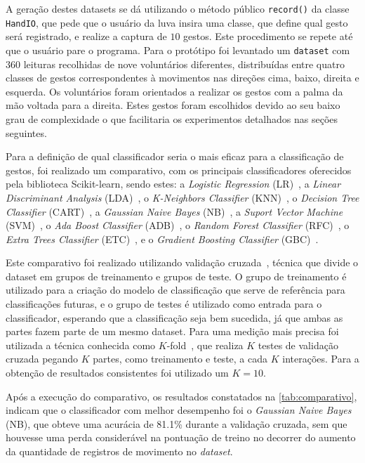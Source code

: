 A geração destes datasets se dá utilizando o método público \texttt{record()} da classe \texttt{HandIO}, que pede que o usuário da luva insira uma classe, que define qual gesto será registrado, e realize a captura de $10$ gestos. Este procedimento se repete até que o usuário pare o programa. Para o protótipo foi levantado um \texttt{dataset} com $360$ leituras recolhidas de nove voluntários diferentes, distribuídas entre quatro classes de gestos correspondentes à movimentos nas direções cima, baixo, direita e esquerda. Os voluntários foram orientados a realizar os gestos com a palma da mão voltada para a direita. Estes gestos foram escolhidos devido ao seu baixo grau de complexidade o que facilitaria os experimentos detalhados nas seções seguintes.

Para a definição de qual classificador seria o mais eficaz para a classificação de gestos, foi realizado um comparativo, com os principais classificadores oferecidos pela biblioteca Scikit-learn, sendo estes: a \textit{Logistic Regression} (LR)~\cite{scikit:lr}, a \textit{Linear Discriminant Analysis} (LDA)~\cite{scikit:lda}, o \textit{K-Neighbors Classifier} (KNN)~\cite{scikit:knn}, o \textit{Decision Tree Classifier} (CART)~\cite{scikit:cart}, a \textit{Gaussian Naive Bayes} (NB)~\cite{scikit:nb}, a \textit{Suport Vector Machine} (SVM)~\cite{scikit:svm}, o \textit{Ada Boost Classifier} (ADB)~\cite{scikit:adb}, o \textit{Random Forest Classifier} (RFC)~\cite{scikit:rfc}, o \textit{Extra Trees Classifier} (ETC)~\cite{scikit:etc}, e o \textit{Gradient Boosting Classifier} (GBC)~\cite{scikit:gbc}.

Este comparativo foi realizado utilizando validação cruzada~\cite{scikit:crossval}, técnica que divide o dataset em grupos de treinamento e grupos de teste. O grupo de treinamento é utilizado para a criação do modelo de classificação que serve de referência para classificações futuras, e o grupo de testes é utilizado como entrada para o classificador, esperando que a classificação seja bem sucedida, já que ambas as partes fazem parte de um mesmo dataset. Para uma medição mais precisa foi utilizada a técnica conhecida como $K$-fold~\cite{scikit:crossval}, que realiza $K$ testes de validação cruzada pegando $K$ partes, como treinamento e teste, a cada $K$ interações. Para a obtenção de resultados consistentes foi utilizado um $K = 10$.

Após a execução do comparativo, os resultados constatados na \autoref{tab:comparativo}, indicam que o classificador com melhor desempenho foi o \textit{Gaussian Naive Bayes} (NB), que obteve uma acurácia de 81.1\% durante a validação cruzada, sem que houvesse uma perda considerável na pontuação de treino no decorrer do aumento da quantidade de registros de movimento no \textit{dataset}.

